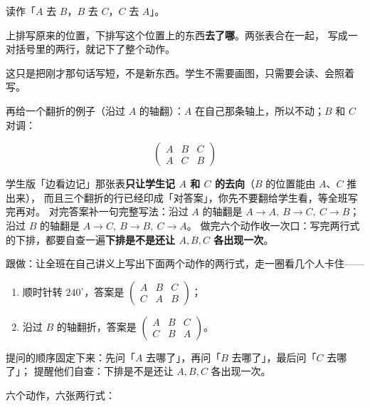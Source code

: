 读作「\(A\) 去 \(B\)，\(B\) 去 \(C\)，\(C\) 去 \(A\)」。

\begin{definition}[置换的双行记号]
  上排写原来的位置，下排写这个位置上的东西\textbf{去了哪}。两张表合在一起，
  写成一对括号里的两行，就记下了整个动作。
\end{definition}

\begin{zhu}
  这只是把刚才那句话写短，不是新东西。学生不需要画图，只需要会读、会照着写。
\end{zhu}

再给一个翻折的例子（沿过 \(A\) 的轴翻）：\(A\) 在自己那条轴上，所以不动；\(B\) 和 \(C\) 对调：

\[
  \begin{pmatrix}
    A & B & C\\
    A & C & B
  \end{pmatrix}
\]

\begin{zhu}
  学生版「边看边记」那张表\textbf{只让学生记 \(A\) 和 \(C\) 的去向}（\(B\) 的位置能由 \(A\)、\(C\) 推出来），
  而且三个翻折的行已经印成「对答案」，你先不要翻给学生看，等全班写完再对。
  对完答案补一句完整写法：沿过 \(A\) 的轴翻是 \(A\to A,\ B\to C,\ C\to B\)；
  沿过 \(B\) 的轴翻是 \(A\to C,\ B\to B,\ C\to A\)。
  做完六个动作收一次口：写完两行式的下排，都要自查一遍\textbf{下排是不是还让 \(A,B,C\) 各出现一次}。
\end{zhu}

\begin{caozuo}
  跟做：让全班在自己讲义上写出下面两个动作的两行式，走一圈看几个人卡住——
  \begin{enumerate}
    \item 顺时针转 \(240^\circ\)，答案是 \(\begin{pmatrix}A&B&C\\C&A&B\end{pmatrix}\)；
    \item 沿过 \(B\) 的轴翻折，答案是 \(\begin{pmatrix}A&B&C\\C&B&A\end{pmatrix}\)。
  \end{enumerate}
  提问的顺序固定下来：先问「\(A\) 去哪了」，再问「\(B\) 去哪了」，最后问「\(C\) 去哪了」；
  提醒他们自查：下排是不是还让 \(A,B,C\) 各出现一次。
\end{caozuo}

\noindent 六个动作，六张两行式：

